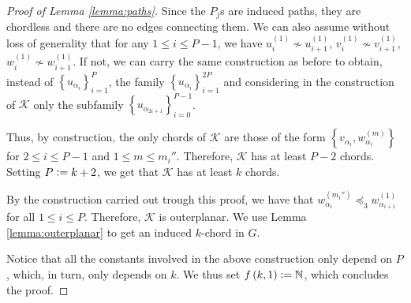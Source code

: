 \documentclass[12pt]{article}
\theoremstyle{definition}
\newcommand{\defeq}{\vcentcolon=}
\begin{document}
\begin{proof}[Proof of Lemma \ref{lemma:paths}]
        Since the $P_{j}$s are induced paths,
        they are chordless and there are no
        edges connecting them. We can also
        assume without loss of generality
        that for any $1 \leq i \leq P-1$,
        we have $u_{i}^{\left(1\right)} \not \sim 
        u_{i+1}^{\left(1\right)}$,
        $v_{i}^{\left(1\right)} \not \sim
        v_{i+1}^{\left(1\right)}$,
        $w_{i}^{\left(1\right)} \not \sim
        w_{i+1}^{\left(1\right)}$.
        If not, we can carry the same
        construction as before to obtain,
        instead of $\left\{u_{\alpha_{i}}\right\}_{i=1}^{P}$,
        the family $\left\{u_{\alpha_{i}}\right\}_{i=1}^{2P}$ 
        and considering in the construction of
        $\mathcal{K}$ only the subfamily
        $\left\{u_{\alpha_{2i + 1}}\right\}_{i=0}^{P-1}$.

        Thus, by construction, the only chords of
        $\mathcal{K}$ are those of the form
        $\left\{v_{\alpha_{i}}, w_{\alpha_{i}}^{\left(m\right)}\right\}$ 
        for $2 \leq i \leq P-1$ and
        $1 \leq m \leq m_{i}''$.
        Therefore, $\mathcal{K}$ has at
        least $P-2$ chords. Setting
        $P \defeq k + 2$, we get that
        $\mathcal{K}$ has at least $k$ chords.

        By the construction carried out
        trough this proof, we have that
        $w_{\alpha_{i}}^{\left(m_{i}''\right)}
        \preceq_3 w_{\alpha_{i + 1}}^{\left(1\right)}$
        for all $1 \leq i \leq P$.
        Therefore, $\mathcal{K}$ is outerplanar.
        We use Lemma \ref{lemma:outerplanar}
        to get an induced $k$-chord in $G$.

        Notice that all the constants involved in the
        above construction only depend on $P$,
        which, in turn, only depends on $k$.
        We thus set $f\left(k, 1\right) \defeq \mathbb{N}$,
        which concludes the proof.
    \end{proof}
    
    \printbibliography
\end{document}
